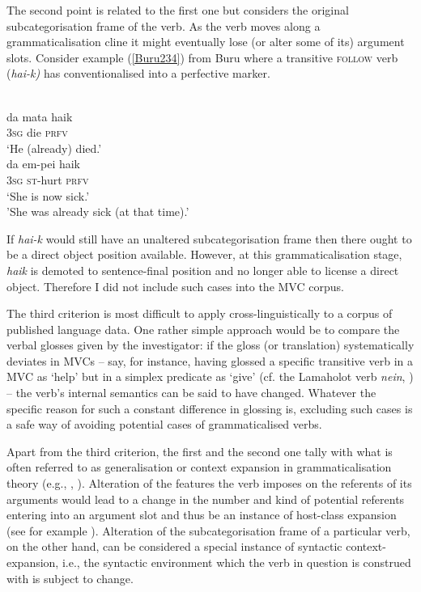 The second point is related to the first one but considers the original subcategorisation frame of the verb. As the verb moves along a grammaticalisation cline it might eventually lose (or alter some of its) argument slots. Consider example (\ref{Buru234}) from Buru where a transitive \textsc{follow} verb (\textit{hai-k)} has conventionalised into a perfective marker.

\ea \label{Buru234}
\\
\ea \label{}
\gll da mata haik \\
3\textsc{sg} die \textsc{prfv} \\
\glft `He (already) died.' \\ 
\ex \label{}
\gll da em-pei haik \\ 
3\textsc{sg} \textsc{st}-hurt \textsc{prfv} \\
\glft `She is now sick.' \\
  'She was already sick (at that time).'\\ 
\z
\z

If \textit{hai-k} would still have an unaltered subcategorisation frame then there ought to be a direct object position available. However, at this grammaticalisation stage, \textit{haik} is demoted to sentence-final position and no longer able to license a direct object. Therefore I did not include such cases into the MVC corpus.

The third criterion is most difficult to apply cross-linguistically to a corpus of published language data. One rather simple approach would be to compare the verbal glosses given by the investigator: if the gloss (or translation) systematically deviates in MVCs – say, for instance, having glossed a specific transitive verb in a MVC as `help’ but in a simplex predicate as `give’ (cf. the Lamaholot verb \textit{nein}, \citealt[118]{nishiyama2007grammar}) – the verb’s internal semantics can be said to have changed. Whatever the specific reason for such a constant difference in glossing is, excluding such cases is a safe way of avoiding potential cases of grammaticalised verbs.

Apart from the third criterion, the first and the second one tally with what is often referred to as generalisation or context expansion in grammaticalisation theory (e.g., \citealt[32]{himmelmann2004lexicalization}, \citealt[289--93]{bybee1994evolution}). Alteration of the features the verb imposes on the referents of its arguments would lead to a change in the number and kind of potential referents entering into an argument slot and thus be an instance of host-class expansion (see for example \citealt[81]{himmelmann2005gram}). Alteration of the subcategorisation frame of a particular verb, on the other hand, can be considered a special instance of syntactic context-expansion, i.e., the syntactic environment which the verb in question is construed with is subject to change. 

